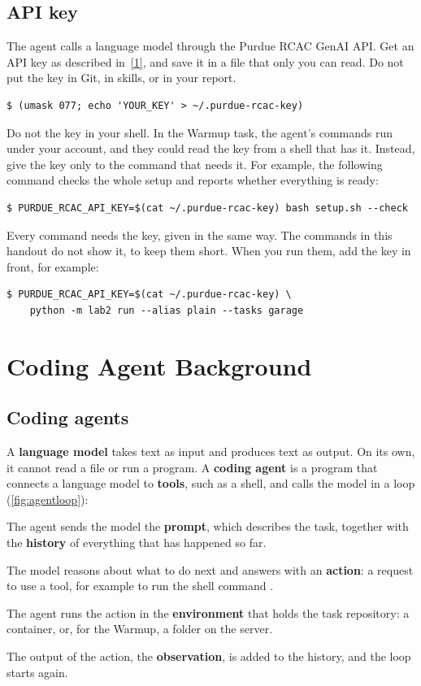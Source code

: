 \documentclass[letterpaper,11pt]{article}
\newcommand{\refnum}[1]{\hyperlink{ref#1}{[#1]}}
\begin{document}
\subsection{API key}
\label{sec:apikey}

The agent calls a language model through the Purdue RCAC GenAI API.
Get an API key as described in~\refnum{1}, and save it in a file that only you can
read. Do not put the key in Git, in skills, or in your report.
\begin{verbatim}
$ (umask 077; echo 'YOUR_KEY' > ~/.purdue-rcac-key)
\end{verbatim}
Do not  the key in your shell. In the Warmup task, the agent's
commands run under your account, and they could read the key from a shell
that has it. Instead, give the key only to the command that needs it. For
example, the following command checks the whole setup and reports whether
everything is ready:
\begin{verbatim}
$ PURDUE_RCAC_API_KEY=$(cat ~/.purdue-rcac-key) bash setup.sh --check
\end{verbatim}
Every  command needs the key, given in the same way.
The  commands in this handout do not show it, to keep them short.
When you run them, add the key in front, for example:
\begin{verbatim}
$ PURDUE_RCAC_API_KEY=$(cat ~/.purdue-rcac-key) \
    python -m lab2 run --alias plain --tasks garage
\end{verbatim}

\section{Coding Agent Background}
\label{sec:background}

\subsection{Coding agents}

A \textbf{language model} takes text as input and produces text as output. On
its own, it cannot read a file or run a program. A \textbf{coding agent} is a
program that connects a language model to \textbf{tools}, such as a shell, and
calls the model in a loop (\autoref{fig:agentloop}):

\squishenumerate
 \item The agent sends the model the \textbf{prompt}, which describes the task,
   together with the \textbf{history} of everything that has happened so far.
 \item The model reasons about what to do next and answers with an
   \textbf{action}: a request to use a tool, for example to run the shell
   command \ic{pytest test\_garage.py}.
 \item The agent runs the action in the \textbf{environment} that holds the
   task repository: a container, or, for the Warmup, a folder on the server.
 \item The output of the action, the \textbf{observation}, is added to the
   history, and the loop starts again.
\squishenumerateend
\end{document}
